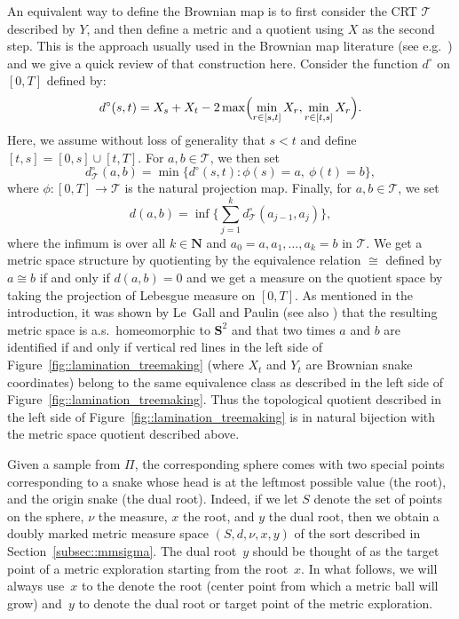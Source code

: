 \documentclass[10pt]{amsart}
\let\mathcal\mathscr
\let\oldS\S
\theoremstyle{plain}
\numberwithin{theorem}{section}
\theoremstyle{definition}
\newcommand{\CT}{{\mathcal T}}\let\treespace\CT
\newcommand{\N}{\mathbf{N}}
\renewcommand{\S}{{\mathbf S}}
\let\snakeexcursionmeasure \Pi
\begin{document}
An equivalent way to define the Brownian map is to first consider the CRT $\CT$ described by $Y$, and then define a metric and a quotient using $X$ as the second step. This is the approach usually used in the Brownian map literature (see e.g.\ \cite[\oldS 3.5]{legall2014icm}) and we give a quick review of that construction here. Consider the function $d^\circ$ on $[0,T]$ defined by:
\begin{equation}
\label{eqn::circ_distance_time}
d^\circ(s,t) = X_s + X_t - 2\max\Bigl( \min_{r \in [s,t]} X_r, \min_{r \in [t,s]} X_r \Bigr).
\end{equation}
Here, we assume without loss of generality that $s < t$ and define $[t,s] = [0,s] \cup [t,T]$. For $a,b \in \CT$, we then set
\begin{equation}
\label{eqn::circe_distance_tree}
d_\CT^\circ(a,b) = \min\{ d^\circ(s,t) : \phi(s) = a,\ \phi(t) = b\},
\end{equation}
where $\phi \colon [0,T] \to \CT$ is the natural projection map. Finally, for $a,b \in \CT$, we set
\begin{equation}
\label{eqn::bm_distance_inf}
d(a,b) = \inf\biggl\{ \sum_{j=1}^k d_\CT^\circ(a_{j-1},a_j) \biggr\},
\end{equation}
where the infimum is over all $k \in \N$ and $a_0=a,a_1,\ldots,a_k=b$ in $\CT$. We get a metric space structure by quotienting by the equivalence relation $\cong$ defined by $a \cong b$ if and only if $d(a,b) = 0$ and we get a measure on the quotient space by taking the projection of Lebesgue measure on $[0,T]$.
As mentioned in the introduction, it was shown by Le~Gall and Paulin \cite{le2008scaling} (see also \cite{MR2399286}) that the resulting metric space is a.s.\ homeomorphic to $\S^2$ and that two times $a$ and $b$ are identified if and only if vertical red lines in the left side of Figure~\ref{fig::lamination_treemaking} (where $X_t$ and $Y_t$ are Brownian snake coordinates) belong to the same equivalence class as described in the left side of Figure~\ref{fig::lamination_treemaking}. Thus the topological quotient described in the left side of Figure~\ref{fig::lamination_treemaking} is in natural bijection with the metric space quotient described above.

Given a sample from $\snakeexcursionmeasure$, the corresponding sphere comes with two special points corresponding to a snake whose head is at the leftmost possible value (the root), and the origin snake (the dual root). Indeed, if we let $S$ denote the set of points on the sphere, $\nu$ the measure, $x$ the root, and $y$ the dual root, then we obtain a doubly marked metric measure space $(S,d, \nu,x,y)$ of the sort described in Section~\ref{subsec::mmsigma}. The dual root~$y$ should be thought of as the target point of a metric exploration starting from the root~$x$. In what follows, we will always use~$x$ to the denote the root (center point from which a metric ball will grow) and~$y$ to denote the dual root or target point of the metric exploration.
\end{document}
